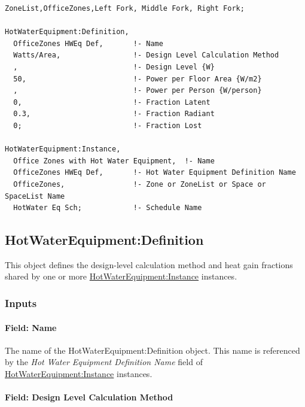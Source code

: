 \begin{lstlisting}
ZoneList,OfficeZones,Left Fork, Middle Fork, Right Fork;

HotWaterEquipment:Definition,
  OfficeZones HWEq Def,       !- Name
  Watts/Area,                 !- Design Level Calculation Method
  ,                           !- Design Level {W}
  50,                         !- Power per Floor Area {W/m2}
  ,                           !- Power per Person {W/person}
  0,                          !- Fraction Latent
  0.3,                        !- Fraction Radiant
  0;                          !- Fraction Lost

HotWaterEquipment:Instance,
  Office Zones with Hot Water Equipment,  !- Name
  OfficeZones HWEq Def,       !- Hot Water Equipment Definition Name
  OfficeZones,                !- Zone or ZoneList or Space or SpaceList Name
  HotWater Eq Sch;            !- Schedule Name
\end{lstlisting}

\subsection{HotWaterEquipment:Definition}\label{hotwaterequipmentdefinition}

This object defines the design-level calculation method and heat gain fractions shared by one or more \hyperref[hotwaterequipmentinstance]{HotWaterEquipment:Instance} instances.

\subsubsection{Inputs}\label{inputs-5-hotwaterequipmentdefinition}

\paragraph{Field: Name}\label{field-name-hotwaterequipmentdefinition}

The name of the HotWaterEquipment:Definition object. This name is referenced by the \textit{Hot Water Equipment Definition Name} field of \hyperref[hotwaterequipmentinstance]{HotWaterEquipment:Instance} instances.

\paragraph{Field: Design Level Calculation Method}\label{field-design-level-calculation-method-3-hw-definition}

